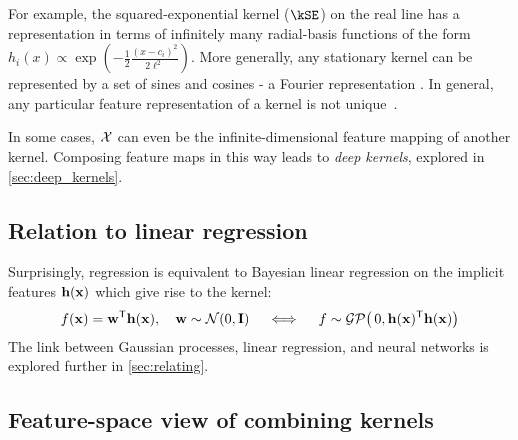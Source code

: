 For example, the squared-exponential kernel ($\kSE$) on the real line has a representation in terms of infinitely many radial-basis functions of the form ${h_i(x) \propto \exp( -\frac{1}{2} \frac{(x - c_i)^2}{2\ell^2})}$.
More generally, any stationary kernel can be represented by a set of sines and cosines - a Fourier representation \citep{bochner1959lectures}.
In general, any particular feature representation of a kernel is not unique~\citep{minh2006mercer}.

In some cases, $\mathcal{X}$ can even be the infinite-dimensional feature mapping of another kernel.  Composing feature maps in this way leads to \emph{deep kernels}, explored in \cref{sec:deep_kernels}.



\subsection{Relation to linear regression}

Surprisingly, \gp{} regression is equivalent to Bayesian linear regression on the implicit features ${\bf{h}}({\bf{x}})$ which give rise to the kernel:
%
\begin{align}
f({\bf{x}}) = {\bf{w}}^{\mathsf{T}} {\bf{h}}({\bf{x}}), \quad {\bf{w}} \sim \mathcal{N}\!\left(0,\mathbf{I}\right) \quad
\iff
\quad f \sim \mathcal{GP}\!\left(\, 0, {\bf{h}}({\bf{x}}) ^{\mathsf{T}} {\bf{h}}({\bf{x}}) \right)
\end{align}
%
The link between Gaussian processes, linear regression, and neural networks is explored further in \cref{sec:relating}.


\subsection{Feature-space view of combining kernels}

\def\feata{\va}
\def\featb{\vb}



